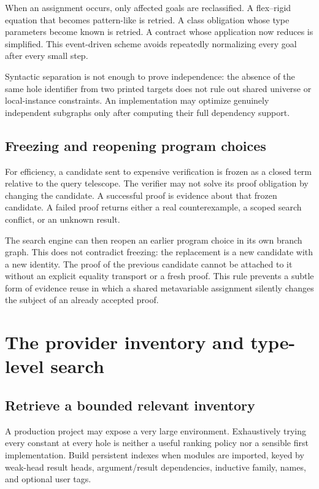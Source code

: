 When an assignment occurs, only affected goals are reclassified. A flex--rigid equation that becomes pattern-like is retried. A class obligation whose type parameters become known is retried. A contract whose application now reduces is simplified. This event-driven scheme avoids repeatedly normalizing every goal after every small step.

Syntactic separation is not enough to prove independence: the absence of the same hole identifier from two printed targets does not rule out shared universe or local-instance constraints. An implementation may optimize genuinely independent subgraphs only after computing their full dependency support.

\subsection{Freezing and reopening program choices}
For efficiency, a candidate sent to expensive verification is frozen as a closed term relative to the query telescope. The verifier may not solve its proof obligation by changing the candidate. A successful proof is evidence about that frozen candidate. A failed proof returns either a real counterexample, a scoped search conflict, or an unknown result.

The search engine can then reopen an earlier program choice in its own branch graph. This does not contradict freezing: the replacement is a new candidate with a new identity. The proof of the previous candidate cannot be attached to it without an explicit equality transport or a fresh proof. This rule prevents a subtle form of evidence reuse in which a shared metavariable assignment silently changes the subject of an already accepted proof.

\section{The provider inventory and type-level search}
\label{sec:providers}
\subsection{Retrieve a bounded relevant inventory}
A production project may expose a very large environment. Exhaustively trying every constant at every hole is neither a useful ranking policy nor a sensible first implementation. Build persistent indexes when modules are imported, keyed by weak-head result heads, argument/result dependencies, inductive family, names, and optional user tags.

